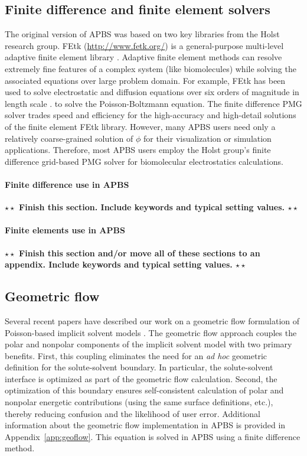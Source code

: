 \documentclass[11pt,titlepage]{article}
\newcommand{\todo}[1]{\textbf{$\star \star$ {#1} $\star \star$}}
\begin{document}
\subsection{Finite difference and finite element solvers}
The original version of APBS was based on two key libraries from the Holst research group.
FEtk (\url{http://www.fetk.org/}) is a general-purpose multi-level adaptive finite element library \cite{FEtk}.
Adaptive finite element methods can resolve extremely fine features of a complex system (like biomolecules) while solving the associated equations over large problem domain.
For example, FEtk has been used to solve electrostatic and diffusion equations over six orders of magnitude in length scale \cite{Tai}.
\cite{PMG} to solve the Poisson-Boltzmann equation.
The finite difference PMG solver trades speed and efficiency for the high-accuracy and high-detail solutions of the finite element FEtk library.
However, many APBS users need only a relatively coarse-grained solution of $\phi$ for their visualization or simulation applications.
Therefore, most APBS users employ the Holst group's finite difference grid-based PMG solver for biomolecular electrostatics calculations.

\paragraph{Finite difference use in APBS}
\todo{Finish this section. Include keywords and typical setting values.}

\paragraph{Finite elements use in APBS}
\todo{Finish this section and/or move all of these sections to an appendix.  Include keywords and typical setting values.}

\subsection{Geometric flow} \label{sec:geoflow}
Several recent papers have described our work on a geometric flow formulation of Poisson-based implicit solvent models \cite{geoflow, Thomas2013}.
The geometric flow approach couples the polar and nonpolar components of the implicit solvent model with two primary benefits.
First, this coupling eliminates the need for an \textit{ad hoc} geometric definition for the solute-solvent boundary.
In particular, the solute-solvent interface is optimized as part of the geometric flow calculation.
Second, the optimization of this boundary ensures self-consistent calculation of polar and nonpolar energetic contributions (using the same surface definitions, etc.), thereby reducing confusion and the likelihood of user error.
Additional information about the geometric flow implementation in APBS is provided in Appendix~\ref{app:geoflow}.
This equation is solved in APBS using a finite difference method.
\end{document}
